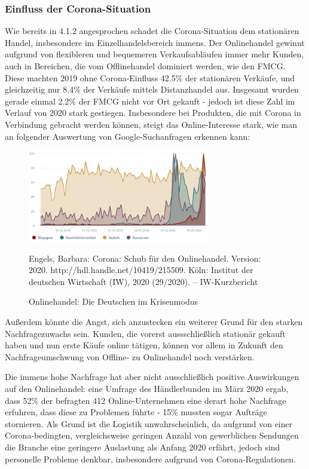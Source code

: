 \begin{folding} \subsubsection{Einfluss der Corona-Situation}
 
 Wie bereits in 4.1.2 angesprochen schadet die Corona-Situation dem stationären Handel, insbesondere im Einzelhandelsbereich immens. Der Onlinehandel gewinnt aufgrund von flexibleren und bequemeren Verkaufsabläufen immer mehr Kunden, auch in Bereichen, die vom Offlinehandel dominiert werden, wie den \ac{FMCG}. 
Diese machten 2019 ohne Corona-Einfluss 42.5\% der stationären Verkäufe, und gleichzeitig nur 8.4\% der Verkäufe mittels Distanzhandel aus. Insgesamt wurden gerade einmal 2.2\% der \ac{FMCG} nicht vor Ort gekauft - jedoch ist diese Zahl im Verlauf von 2020 stark gestiegen. Insbesondere bei Produkten, die mit Corona in Verbindung gebracht werden können, steigt das Online-Interesse stark, wie man an folgender Auswertung von Google-Suchanfragen erkennen kann:  

 \begin{figure}[h]
    \begin{center}
        \includegraphics[width=8cm]{media/Fabian-Corona-Produkte.png}
        \caption{Onlinehandel: Die Deutschen im Krisenmodus}
        \label{konsumwandel}
        \bildquelle  Engels, Barbara:   Corona: Schub für den Onlinehandel. Version: 2020. http://hdl.handle.net/10419/215509. Köln: Institut der deutschen Wirtschaft (IW), 2020 (29/2020). – IW-Kurzbericht
    \end{center}
\end{figure}
Außerdem könnte die Angst, sich anzustecken ein weiterer Grund für den starken Nachfragezuwachs sein. Kunden, die vorerst aussschließlich stationär gekauft haben und nun erste Käufe online tätigen, können vor allem in Zukunft den Nachfrageumschwung von Offline- zu Onlinehandel noch verstärken\cite{corona-schub}.

Die immens hohe Nachfrage hat aber nicht ausschließlich positive Auswirkungen auf den Onlinehandel: eine Umfrage des Händlerbunden im März 2020 ergab, dass 52\% der befragten 412 Online-Unternehmen eine derart hohe Nachfrage erfuhren, dass diese zu Problemen führte - 15\% mussten sogar Aufträge stornieren. Als Grund ist die Logistik unwahrscheinlich, da aufgrund von einer Corona-bedingten, vergleichsweise geringen Anzahl von gewerblichen Sendungen die Branche eine geringere Auslastung als Anfang 2020 erfährt, jedoch sind personelle Probleme denkbar, insbesondere aufgrund von Corona-Regulationen\cite{haendlerbund-studie}.
 
  
 
\end{folding}
